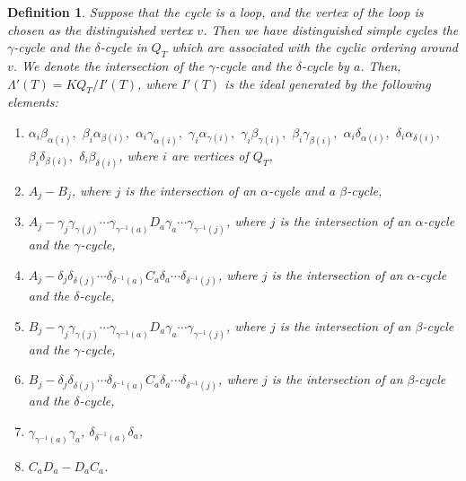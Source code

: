 \documentclass[12pt]{amsart}
\newtheorem{definition}[thm]{Definition}
\numberwithin{equation}{thm}
\newcounter{ni}
\begin{document}
\begin{definition}
Suppose that the cycle is a loop, and the vertex of the loop is chosen as the distinguished vertex $v$. 
Then we have distinguished simple cycles the $\gamma$-cycle and the $\delta$-cycle in $Q_{T}$ 
which are associated with the cyclic ordering around $v$. 
We denote the intersection of the $\gamma$-cycle and the $\delta$-cycle by $a$.
Then, $\Lambda'(T) = KQ_T/I'(T)$, where $I'(T)$ is the ideal generated by the following elements:
\begin{enumerate}
\item $\alpha_i\beta_{\alpha(i)},$ $\beta_i\alpha_{\beta(i)},$ $\alpha_i\gamma_{\alpha(i)},$ $\gamma_i\alpha_{\gamma(i)},$ 
$\gamma_i\beta_{\gamma(i)},$ $\beta_i\gamma_{\beta(i)},$ $\alpha_i\delta_{\alpha(i)},$ $\delta_i\alpha_{\delta(i)},$  
$\beta_i\delta_{\beta(i)},$ $\delta_i\beta_{\delta(i)}$, where $i$ are vertices of $Q_T$,
\item $A_j-B_j$, where $j$ is the intersection of an $\alpha$-cycle and a $\beta$-cycle,
\item $A_j-\gamma_j\gamma_{\gamma(j)}\cdots\gamma_{\gamma^{-1}(a)}D_{a}\gamma_{a}\cdots\gamma_{\gamma^{-1}(j)}$, where $j$ is the intersection of an $\alpha$-cycle and the $\gamma$-cycle,
\item $A_j-\delta_j\delta_{\delta(j)}\cdots\delta_{\delta^{-1}(a)}C_{a}\delta_{a}\cdots\delta_{\delta^{-1}(j)}$, where $j$ is the intersection of an $\alpha$-cycle and the $\delta$-cycle,
\item $B_j-\gamma_j\gamma_{\gamma(j)}\cdots\gamma_{\gamma^{-1}(a)}D_{a}\gamma_{a}\cdots\gamma_{\gamma^{-1}(j)}$, where $j$ is the intersection of an $\beta$-cycle and the $\gamma$-cycle,
\item $B_j-\delta_j\delta_{\delta(j)}\cdots\delta_{\delta^{-1}(a)}C_{a}\delta_{a}\cdots\delta_{\delta^{-1}(j)}$, where $j$ is the intersection of an $\beta$-cycle and the $\delta$-cycle,
\item $\gamma_{\gamma^{-1}(a)}\gamma_{a}$, $\delta_{\delta^{-1}(a)}\delta_{a}$,
\item $C_{a}D_{a} - D_{a}C_{a}$.
\end{enumerate}
\end{definition}
\end{document}
